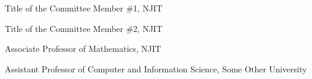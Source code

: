 

       {Title of the Committee Member \#1, NJIT}

       {Title of the Committee Member \#2, NJIT}
	
       {Associate Professor of Mathematics, NJIT}
	
       {Assistant Professor of Computer and Information Science, Some Other University}
